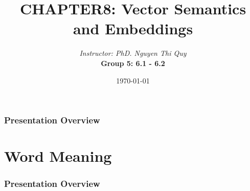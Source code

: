 \documentclass[13.5pt,aspecratio=169, xcolor=dvipsnames]{beamer}
\title{CHAPTER8: Vector Semantics and
Embeddings}
\author[CS221]{\textit{Instructor: PhD. Nguyen Thi Quy}\\ \bigskip \textbf{Group 5: 6.1 - 6.2}}
\date{\today}
\begin{document}
\maketitle



\begin{frame}
    \doublespacing
        \frametitle{Presentation Overview} %
        
        \tableofcontents %
\end{frame}
    
    
    \section{Word Meaning} %
    \begin{frame}
        \doublespacing
            \frametitle{Presentation Overview} %
            
            \tableofcontents[currentsection] %
    \end{frame}

\end{document}
